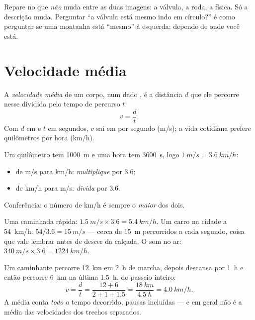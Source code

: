 \begin{remark}
Repare no que \emph{não} muda entre as duas imagens: a válvula, a roda, a
física. Só a descrição muda. Perguntar ``a válvula está mesmo indo em
círculo?'' é como perguntar se uma montanha está ``mesmo'' à esquerda:
depende de onde você está.
\end{remark}

\section{Velocidade média}

\begin{definition}\label{def:g10:relative-motion:speed}
A \emph{velocidade média} de um corpo, num dado
, é a distância $d$ que ele percorre nesse 
dividida pelo tempo de percurso $t$:
\[
v = \frac{d}{t} .
\]
Com $d$ em  e $t$ em segundos, $v$ sai em  por segundo
(\unit{m/s}); a vida cotidiana prefere quilômetros por hora
(\unit{km/h}).
\end{definition}

\begin{method}\label{met:g10:relative-motion:convert}
Um quilômetro tem \qty{1000}{m} e uma hora tem \qty{3600}{s}, logo
$\qty{1}{m/s} = \qty{3.6}{km/h}$:
\begin{itemize}
  \item de \unit{m/s} para \unit{km/h}: \emph{multiplique} por $3.6$;
  \item de \unit{km/h} para \unit{m/s}: \emph{divida} por $3.6$.
\end{itemize}
Conferência: o número de \unit{km/h} é sempre o \emph{maior} dos dois.
\end{method}

\begin{example}\label{ex:g10:relative-motion:convert}
Uma caminhada rápida: $\qty{1.5}{m/s} \times 3.6 = \qty{5.4}{km/h}$. Um
carro na cidade a \qty{54}{km/h}: $54 / 3.6 = \qty{15}{m/s}$ --- cerca de
\qty{15}{m} percorridos a cada segundo, coisa que vale lembrar antes de
descer da calçada. O som no ar:
$\qty{340}{m/s} \times 3.6 = \qty{1224}{km/h}$.
\end{example}

\begin{example}\label{ex:g10:relative-motion:hike}
Um caminhante percorre \qty{12}{km} em \qty{2}{h} de marcha, depois
descansa por \qty{1}{h} e então percorre \qty{6}{km} na última
\qty{1.5}{h}.  do passeio inteiro:
\[
v = \frac{d}{t} = \frac{12 + 6}{2 + 1 + 1.5}
= \frac{\qty{18}{km}}{\qty{4.5}{h}} = \qty{4.0}{km/h}.
\]
A média conta \emph{todo} o tempo decorrido, pausas incluídas --- e em
geral não é a média das velocidades dos trechos separados.
\end{example}

